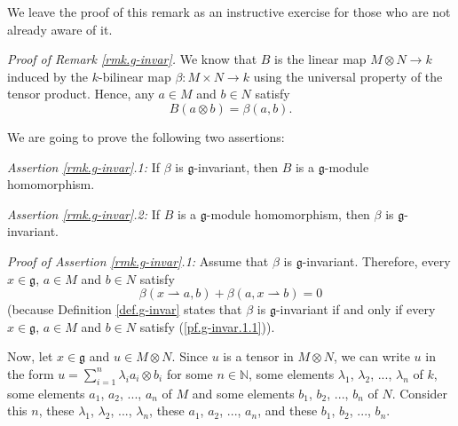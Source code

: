 \documentclass[etingof-lie.tex]{subfiles}
\begin{document}
\begin{vershort}
We leave the proof of this remark as an instructive exercise for those who are
not already aware of it.
\end{vershort}

\begin{verlong}
\textit{Proof of Remark \ref{rmk.g-invar}.} We know that $B$ is the linear map
$M\otimes N\rightarrow k$ induced by the $k$-bilinear map $\beta:M\times
N\rightarrow k$ using the universal property of the tensor product. Hence, any
$a\in M$ and $b\in N$ satisfy%
\begin{equation}
B\left(  a\otimes b\right)  =\beta\left(  a,b\right)  . \label{pf.g-invar.Bb}%
\end{equation}


We are going to prove the following two assertions:

\textit{Assertion \ref{rmk.g-invar}.1:} If $\beta$ is $\mathfrak{g}%
$-invariant, then $B$ is a $\mathfrak{g}$-module homomorphism.

\textit{Assertion \ref{rmk.g-invar}.2:} If $B$ is a $\mathfrak{g}$-module
homomorphism, then $\beta$ is $\mathfrak{g}$-invariant.

\textit{Proof of Assertion \ref{rmk.g-invar}.1:} Assume that $\beta$ is
$\mathfrak{g}$-invariant. Therefore, every $x\in\mathfrak{g}$, $a\in M$ and
$b\in N$ satisfy%
\begin{equation}
\beta\left(  x\rightharpoonup a,b\right)  +\beta\left(  a,x\rightharpoonup
b\right)  =0 \label{pf.g-invar.1.1}%
\end{equation}
(because Definition \ref{def.g-invar} states that $\beta$ is $\mathfrak{g}%
$-invariant if and only if every $x\in\mathfrak{g}$, $a\in M$ and $b\in N$
satisfy (\ref{pf.g-invar.1.1})).

Now, let $x\in\mathfrak{g}$ and $u\in M\otimes N$. Since $u$ is a tensor in
$M\otimes N$, we can write $u$ in the form $u=\sum\limits_{i=1}^{n}\lambda
_{i}a_{i}\otimes b_{i}$ for some $n\in\mathbb{N}$, some elements $\lambda_{1}%
$, $\lambda_{2}$, $...$, $\lambda_{n}$ of $k$, some elements $a_{1}$, $a_{2}$,
$...$, $a_{n}$ of $M$ and some elements $b_{1}$, $b_{2}$, $...$, $b_{n}$ of
$N$. Consider this $n$, these $\lambda_{1}$, $\lambda_{2}$, $...$,
$\lambda_{n}$, these $a_{1}$, $a_{2}$, $...$, $a_{n}$, and these $b_{1}$,
$b_{2}$, $...$, $b_{n}$.


\end{verlong}
\end{document}
